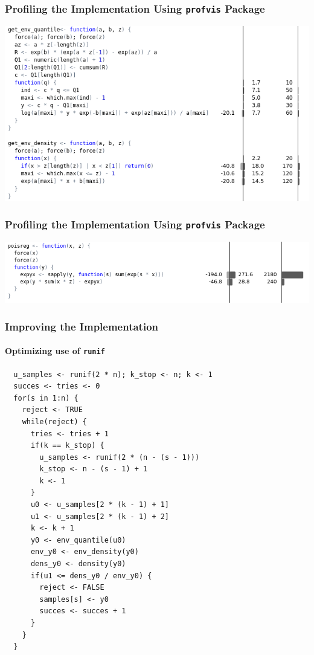 \documentclass[aspectratio=169]{beamer}
\begin{document}
\begin{frame}
  \frametitle{Profiling the Implementation Using \texttt{profvis} Package}
  \centering
  \includegraphics[scale = 0.4]{figure/ProfileHelper.png}
\end{frame}
\begin{frame}
  \frametitle{Profiling the Implementation Using \texttt{profvis} Package}
  \centering
  \includegraphics[scale = 0.5]{figure/ProfileLike.png}
\end{frame}
\begin{frame}[fragile]
  \frametitle{Improving the Implementation}
  \framesubtitle{Optimizing use of \texttt{runif}}  
\begin{verbatim}
  u_samples <- runif(2 * n); k_stop <- n; k <- 1
  succes <- tries <- 0
  for(s in 1:n) {
    reject <- TRUE
    while(reject) {
      tries <- tries + 1
      if(k == k_stop) {
        u_samples <- runif(2 * (n - (s - 1)))
        k_stop <- n - (s - 1) + 1
        k <- 1
      }
      u0 <- u_samples[2 * (k - 1) + 1]
      u1 <- u_samples[2 * (k - 1) + 2]
      k <- k + 1
      y0 <- env_quantile(u0)
      env_y0 <- env_density(y0)
      dens_y0 <- density(y0)
      if(u1 <= dens_y0 / env_y0) {
        reject <- FALSE
        samples[s] <- y0
        succes <- succes + 1
      }
    }
  }
\end{verbatim}
\end{frame}
\end{document}
